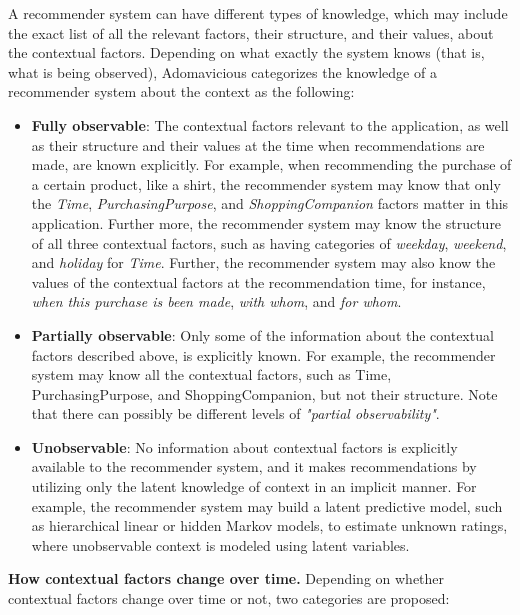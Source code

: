 A recommender system can have different types of knowledge, which may
include  the exact list of all the relevant factors, their structure,
and their values, about the contextual factors. Depending on what
exactly the system knows (that  is, what is being observed),
Adomavicious categorizes the knowledge of a recommender system about
the context as the following:
	\begin{itemize}
	\item \textbf{Fully observable}: The contextual factors relevant to the 
	application, as well as their structure and their values at the time when 
	recommendations are made, are known explicitly. For example, when
	recommending the purchase of a certain product, like a shirt, the 
	recommender system may know that only the \textit{Time}, \textit{PurchasingPurpose}, 
	and \textit{ShoppingCompanion} factors matter in this application. Further more, 
	the recommender system may know the structure of all three contextual 
	factors, such as having categories of \textit{weekday}, \textit{weekend}, 
	and \textit{holiday} for \textit{Time}. Further, the recommender system 
	may also know the values of the contextual factors at the recommendation 
	time, for instance, \textit{when this purchase is been made}, 
	\textit{with whom}, and \textit{for whom}.
	\item \textbf{Partially observable}: Only some of the information about 
	the contextual factors described above, is explicitly known. For example, 
	the recommender system may know all the contextual factors, such as Time, 
	PurchasingPurpose, and ShoppingCompanion, but not their structure. Note that 
	there can possibly be different levels of \textit{"partial observability"}. 
	\item \textbf{Unobservable}: No information about contextual factors is 
	explicitly available to the recommender system, and it makes recommendations 
	by utilizing only the latent knowledge of context in an implicit manner. 
	For example, the recommender system may build a latent predictive model, 
	such as hierarchical linear or hidden Markov models, to estimate unknown 
	ratings, where unobservable context is modeled using latent variables.
	\end{itemize}
\textbf{How contextual factors change over time.} Depending on whether 
contextual factors change over time or not, two categories are proposed: 
